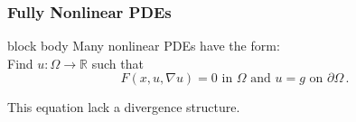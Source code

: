 \documentclass[aspectratio=169,xcolor=dvipsnames,11pt]{beamer}
\begin{document}
\begin{frame}
\begin{minipage}{0.3\linewidth}
\begin{figure}
\begin{minipage}[c]{0.9cm}
 \end{minipage}
\end{figure}
\end{minipage}
\end{frame}

\begin{frame}\frametitle{Fully Nonlinear PDEs}
\begin{minipage}{0.5\linewidth}
\begin{beamercolorbox}[rounded=true, shadow=true, wd=\textwidth]{block body}
Many nonlinear  
PDEs have the form:\\ Find $u: \Omega \to \mathbb R$ such that
\begin{equation*}\label{eq:nonlinear-pde}
F(x,u,\nabla u) = 0 \text{ in } \Omega
\text{ and } u = g \text{ on }\partial \Omega\,.
\end{equation*}

This equation lack a divergence structure.\medskip


\end{beamercolorbox}
\end{minipage}
\end{frame}
\end{document}
